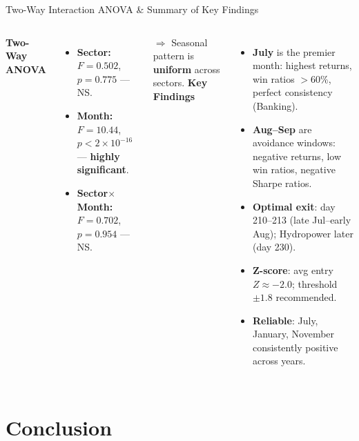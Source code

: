 \documentclass[10pt, aspectratio=169]{beamer}
\begin{document}
\begin{frame}{Two-Way Interaction ANOVA \& Summary of Key Findings}
\begin{columns}[T]
\textbf{Two-Way ANOVA} \cite{kutner2005applied}
\begin{itemize}
    \item \textbf{Sector:} $F=0.502$, $p=0.775$ --- NS.
    \item \textbf{Month:} $F=10.44$, $p<2\!\times\!10^{-16}$ --- \textbf{highly significant}.
    \item \textbf{Sector$\times$Month:} $F=0.702$, $p=0.954$ --- NS.
\end{itemize}
$\Rightarrow$ Seasonal pattern is \textbf{uniform} across sectors.
\textbf{Key Findings}
\begin{itemize}
    \item \textbf{July} is the premier month: highest returns, win ratios $>$60\%, perfect consistency (Banking).
    \item \textbf{Aug--Sep} are avoidance windows: negative returns, low win ratios, negative Sharpe ratios.
    \item \textbf{Optimal exit}: day 210--213 (late Jul--early Aug); Hydropower later (day 230).
    \item \textbf{Z-score}: avg entry $Z\approx -2.0$; threshold $\pm 1.8$ recommended.
    \item \textbf{Reliable}: July, January, November consistently positive across years.
\end{itemize}
\end{columns}
\end{frame}

\section{Conclusion}
\end{document}
